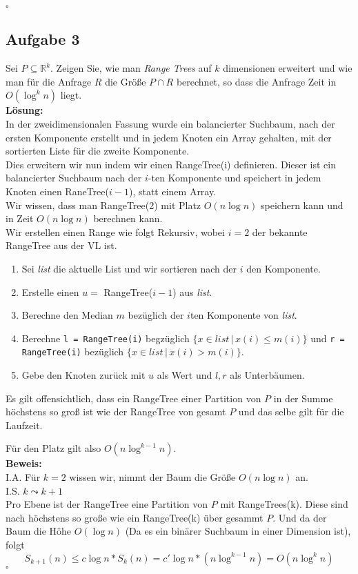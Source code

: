 \documentclass[11pt,a4paper,ngerman]{article}
\begin{document}
    \mbox{}\hfill$\square$
\subsection*{Aufgabe 3}

Sei $P \subseteq \mathbb{R}^k$. Zeigen Sie, wie man \emph{Range Trees} auf $k$ dimensionen erweitert und wie man
für die Anfrage $R$ die Größe $P \cap R$ berechnet, so dass die Anfrage Zeit in $O(\log^k n)$ liegt.\\

\textbf{Lösung:}\\

In der zweidimensionalen Fassung wurde ein balancierter Suchbaum, nach der ersten Komponente erstellt und
in jedem Knoten ein Array gehalten, mit der sortierten Liste für die zweite Komponente.\\

Dies erweitern wir nun indem wir einen RangeTree(i) definieren. Dieser
ist ein balancierter Suchbaum nach der $i$-ten Komponente und speichert in jedem Knoten einen
RaneTree($i-1$), statt einem Array.\\

Wir wissen, dass man RangeTree(2) mit Platz $O(n \log n)$ speichern kann und in Zeit $O(n \log n)$ berechnen kann.\\

Wir erstellen einen Range wie folgt Rekursiv, wobei $i=2$ der bekannte RangeTree aus der VL ist.
\begin{enumerate}[1.]
    \item Sei \emph{list} die aktuelle List und wir sortieren nach der $i$ den Komponente.
    \item Erstelle einen $u = $ RangeTree($i-1$) aus \emph{list}.
    \item Berechne den Median $m$ bezüglich der $i$ten Komponente von \emph{list}.
    \item Berechne \lstinline|l = RangeTree(i)| begzüglich $\{ x \in list \, | \, x(i) \leq m(i) \}$
        und \lstinline|r = RangeTree(i)| bezüglich $\{x \in list \, | \, x(i) > m(i) \}$.
    \item Gebe den Knoten zurück mit $u$ als Wert und $l,r$ als Unterbäumen.
\end{enumerate}

Es gilt offensichtlich, dass ein RangeTree einer Partition von $P$ in der Summe höchstens so groß ist
wie der RangeTree von gesamt $P$ und das selbe gilt für die Laufzeit.

Für den Platz gilt also $O(n \log^{k-1} n)$.\\
\textbf{Beweis:}\\
I.A. Für $k=2$ wissen wir, nimmt der Baum die Größe $O(n \log n)$ an.\\
I.S. $k \leadsto k+1$\\
    Pro Ebene ist der RangeTree eine Partition von $P$ mit RangeTrees(k). Diese
    sind nach höchstens so große wie ein RangeTree(k) über gesammt $P$.
    Und da der Baum die Höhe $O(\log n)$ (Da es ein binärer Suchbaum in einer Dimension ist),
    folgt
    $$
        S_{k+1}(n) \leq c \log n * S_{k}(n) = c' \log n * (n \log^{k-1} n) = O(n \log^k n)
    $$
\mbox{}\hfill$\square$
\end{document}
